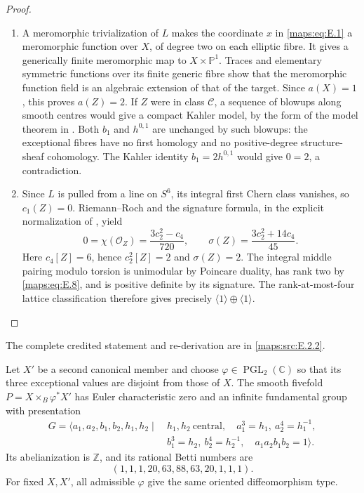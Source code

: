 \begin{proof}
\begin{enumerate}[label=\arabic*.,leftmargin=*]
\item A meromorphic trivialization of $L$ makes the coordinate $x$ in
\eqref{maps:eq:E.1} a meromorphic function over $X$, of degree two on each
elliptic fibre.  It gives a generically finite meromorphic map to
$X\times\mathbb P^1$.  Traces and elementary symmetric functions
over its finite generic fibre show that the meromorphic function
field is an algebraic extension of that of the target.  Since
$a(X)=1$, this proves $a(Z)=2$.  If $Z$ were in class
$\mathcal C$, a sequence of blowups along smooth centres would
give a compact Kahler model, by the form of the model theorem
in \cite[Theorem 1.1 and Remark 1.2]{ffJiaMeng}.
Both $b_1$ and $h^{0,1}$ are unchanged by such blowups: the
exceptional fibres have no first homology and no positive-degree
structure-sheaf cohomology.  The Kahler identity
$b_1=2h^{0,1}$ would give $0=2$, a contradiction.

\item Since $L$ is pulled from a line on $S^6$, its integral first Chern
class vanishes, so $c_1(Z)=0$.  Riemann--Roch and the signature
formula, in the explicit normalization of
\cite[(1.2)--(1.4)]{ffEsoleKang}, yield
\[
 0=\chi(\mathcal O_Z)=\frac{3c_2^2-c_4}{720},\qquad
 \sigma(Z)=\frac{3c_2^2+14c_4}{45}.
\]
Here $c_4[Z]=6$, hence $c_2^2[Z]=2$ and $\sigma(Z)=2$.
The integral middle pairing modulo torsion is unimodular by
Poincare duality, has rank two by \eqref{maps:eq:E.8}, and is positive definite
by its signature.  The rank-at-most-four lattice classification
\cite[Theorem 2.2.1]{ffPetersSterk} therefore gives precisely
$\langle1\rangle\oplus\langle1\rangle$.
\end{enumerate}
\end{proof}

The complete credited statement and re-derivation are in \cref{maps:src:E.2.2}.
\begin{theorem}\label{maps:src:E.2.3}


Let $X'$ be a second canonical member and choose $\varphi\in
\operatorname{PGL}_2(\mathbb C)$ so that its three exceptional
values are disjoint from those of $X$.  The smooth fivefold
$P=X\times_B\varphi^*X'$ has Euler characteristic zero and
an infinite fundamental group with presentation
\[
\begin{split}
G=\langle a_1,a_2,b_1,b_2,h_1,h_2\mid\ &
 h_1,h_2\ \text{central},\quad
 a_1^3=h_1,\ a_2^4=h_1^{-1},\\
 &b_1^3=h_2,\ b_2^4=h_2^{-1},\quad
 a_1a_2b_1b_2=1\rangle .
\end{split}
\tag{E.16}\label{maps:eq:E.16}
\]
Its abelianization is $\mathbb Z$, and its rational Betti numbers are
\[
 (1,1,1,20,63,88,63,20,1,1,1).
 \tag{E.17}\label{maps:eq:E.17}
\]
For fixed $X,X'$, all admissible $\varphi$ give the same oriented
diffeomorphism type.

\end{theorem}


